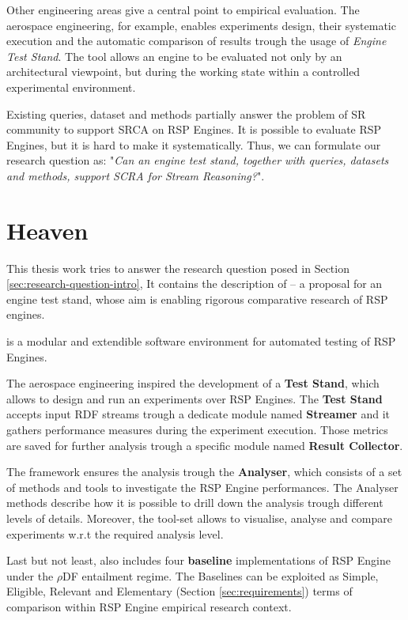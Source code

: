 Other engineering areas give a central point to empirical evaluation. The aerospace engineering, for example, enables experiments design, their systematic execution and the automatic comparison of results trough the usage of \textit{Engine Test Stand}. The tool allows an engine to be evaluated not only by an architectural viewpoint, but during the working state within a controlled experimental environment.

Existing queries, dataset and methods partially answer the problem of SR community to support SRCA on RSP Engines. It is possible to evaluate RSP Engines, but it is hard to make it systematically. Thus, we can formulate our research question as: "\textit{Can an engine test stand, together with queries, datasets and methods, support SCRA for Stream Reasoning?}".

\section{Heaven}\label{sec:heaven-intro}

This thesis work tries to answer the research question posed in Section \ref{sec:research-question-intro}, It contains the description of \name -- a proposal for an engine test stand,  whose aim is enabling rigorous comparative research of RSP engines. 

\name is a modular and extendible software environment for automated testing of RSP Engines. 

The aerospace engineering inspired the development of a \textbf{Test Stand}, which allows to design and run an experiments over RSP Engines. The \textbf{Test Stand} accepts input RDF streams trough a dedicate module named \textbf{Streamer} and it gathers performance measures during the experiment execution. Those metrics are saved for further analysis trough a specific module named \textbf{Result Collector}.

The framework ensures the analysis trough the \textbf{Analyser}, which consists of a set of methods and tools to investigate the RSP Engine performances. The Analyser methods describe how it is possible to drill down the analysis trough different levels of details. Moreover, the tool-set allows to visualise, analyse and compare experiments w.r.t the required analysis level. 

Last but not least, \name also includes four \textbf{baseline} implementations of RSP Engine under the $\rho$DF \cite{DBLP:conf/esws/MunozPG07} entailment regime. The Baselines can be exploited  as Simple, Eligible, Relevant and Elementary (Section \ref{sec:requirements}) terms of comparison within RSP Engine empirical research context.  

